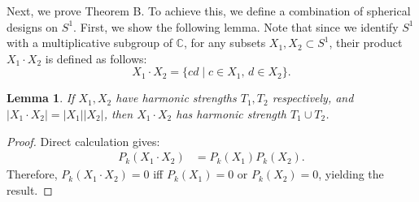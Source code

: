 \documentclass{amsart}
\newtheorem{lem}[thm]{Lemma}
\theoremstyle{definition}
\begin{document}
Next, we prove Theorem B. 
To achieve this, we define a combination of spherical designs on $S^1$.
First, we show the following lemma.
Note that since we identify \(S^1\) with a multiplicative subgroup of $\mathbb{C}$, for any subsets $X_1, X_2 \subset S^1$, their product $X_1 \cdot X_2$ is defined as follows:
\[
X_1 \cdot X_2 = \{cd \mid c \in X_1,\, d \in X_2\}.
\]

\begin{lem}
\label{lem:prod}
If $X_1,X_2$ have harmonic strengths $T_1,T_2$ respectively, and $|X_1\cdot X_2|=|X_1||X_2|$, then $X_1\cdot X_2$ has harmonic strength $T_1\cup T_2$.
\end{lem}

\begin{proof}
  Direct calculation gives:
  \begin{align*}
   P_k(X_1\cdot X_2)&=P_k(X_1)P_k(X_2).
  \end{align*} 
  Therefore, $P_k(X_1\cdot X_2)=0$ iff $P_k(X_1)=0$ or $P_k(X_2)=0$, yielding the result.
\end{proof}
\end{document}
